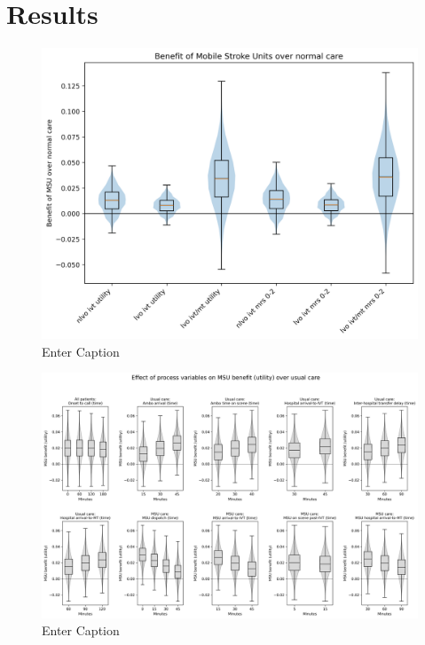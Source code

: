 \section{Results}

\begin{figure}
    \centering
    \includegraphics[width=1\linewidth]{images/scenario_results_summary.png}
    \caption{Enter Caption}
    \label{fig:enter-label}
\end{figure}


\begin{figure}
    \centering
    \includegraphics[width=1\linewidth]{images/msu_net_utility_benefit.png}
    \caption{Enter Caption}
    \label{fig:enter-label}
\end{figure}



